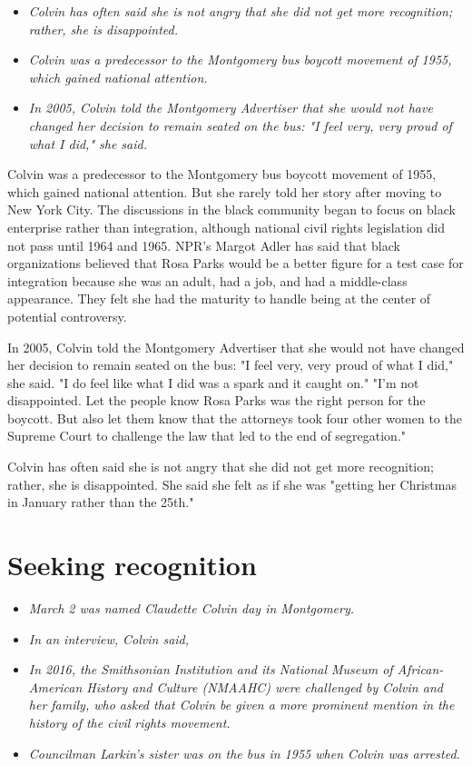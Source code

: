 \begin{itemize}
\item
  \emph{Colvin has often said she is not angry that she did not get more
  recognition; rather, she is disappointed.}
\item
  \emph{Colvin was a predecessor to the Montgomery bus boycott movement
  of 1955, which gained national attention.}
\item
  \emph{In 2005, Colvin told the Montgomery Advertiser that she would
  not have changed her decision to remain seated on the bus: "I feel
  very, very proud of what I did," she said.}
\end{itemize}

Colvin was a predecessor to the Montgomery bus boycott movement of 1955,
which gained national attention. But she rarely told her story after
moving to New York City. The discussions in the black community began to
focus on black enterprise rather than integration, although national
civil rights legislation did not pass until 1964 and 1965. NPR's Margot
Adler has said that black organizations believed that Rosa Parks would
be a better figure for a test case for integration because she was an
adult, had a job, and had a middle-class appearance. They felt she had
the maturity to handle being at the center of potential controversy.

In 2005, Colvin told the Montgomery Advertiser that she would not have
changed her decision to remain seated on the bus: "I feel very, very
proud of what I did," she said. "I do feel like what I did was a spark
and it caught on." "I'm not disappointed. Let the people know Rosa Parks
was the right person for the boycott. But also let them know that the
attorneys took four other women to the Supreme Court to challenge the
law that led to the end of segregation."

Colvin has often said she is not angry that she did not get more
recognition; rather, she is disappointed. She said she felt as if she
was "getting her Christmas in January rather than the 25th."

\section{Seeking recognition}\label{seeking-recognition}

\begin{itemize}
\item
  \emph{March 2 was named Claudette Colvin day in Montgomery.}
\item
  \emph{In an interview, Colvin said,}
\item
  \emph{In 2016, the Smithsonian Institution and its National Museum of
  African-American History and Culture (NMAAHC) were challenged by
  Colvin and her family, who asked that Colvin be given a more prominent
  mention in the history of the civil rights movement.}
\item
  \emph{Councilman Larkin's sister was on the bus in 1955 when Colvin
  was arrested.}
\end{itemize}

